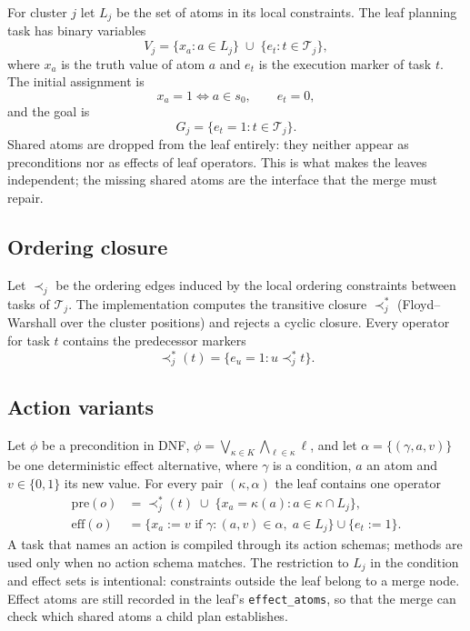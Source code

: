 \documentclass[11pt,a4paper]{article}
\newcommand{\pre}{\mathrm{pre}}
\newcommand{\cT}{\mathcal{T}}
\begin{document}
For cluster $j$ let $L_j$ be the set of atoms in its local constraints. The
leaf planning task has binary variables
\begin{equation}
V_j=\{x_a:a\in L_j\}\;\cup\;\{e_t:t\in\cT_j\},
\end{equation}
where $x_a$ is the truth value of atom $a$ and $e_t$ is the execution marker
of task $t$. The initial assignment is
\begin{equation}
x_a=1\iff a\in s_0,
\qquad
e_t=0,
\end{equation}
and the goal is
\begin{equation}
G_j=\{e_t=1:t\in\cT_j\}.
\end{equation}
Shared atoms are dropped from the leaf entirely: they neither appear as
preconditions nor as effects of leaf operators. This is what makes the leaves
independent; the missing shared atoms are the interface that the merge must
repair.

\subsection{Ordering closure}
Let $\prec_j$ be the ordering edges induced by the local ordering constraints
between tasks of $\cT_j$. The implementation computes the transitive closure
$\prec_j^*$ (Floyd--Warshall over the cluster positions) and rejects a cyclic
closure. Every operator for task $t$ contains the predecessor markers
\begin{equation}
\prec_j^*(t)=\{e_u=1:u\prec_j^*t\}.
\end{equation}

\subsection{Action variants}
Let $\phi$ be a precondition in DNF,
$\phi=\bigvee_{\kappa\in K}\bigwedge_{\ell\in\kappa}\ell$, and let
$\alpha=\{(\gamma,a,v)\}$ be one deterministic effect alternative, where
$\gamma$ is a condition, $a$ an atom and $v\in\{0,1\}$ its new value. For every
pair $(\kappa,\alpha)$ the leaf contains one operator
\begin{equation}
\begin{aligned}
\pre(o)&=\prec_j^*(t)\;\cup\;
\bigl\{x_a=\kappa(a):a\in\kappa\cap L_j\bigr\},\\
\mathrm{eff}(o)&=\bigl\{x_a:=v\text{ if }\gamma:(a,v)\in\alpha,\;a\in L_j\bigr\}
\cup\{e_t:=1\}.
\end{aligned}
\label{eq:leaf-action}
\end{equation}
A task that names an action is compiled through its action schemas; methods are
used only when no action schema matches. The restriction to $L_j$ in the
condition and effect sets is intentional: constraints outside the leaf belong
to a merge node. Effect atoms are still recorded in the leaf's
\texttt{effect\_atoms}, so that the merge can check which shared atoms a child
plan establishes.
\end{document}
